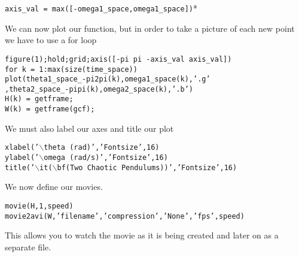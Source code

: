 \documentclass{article}
\begin{document}
\begin{center}
\texttt{axis\_val = max([-omega1\_space,omega1\_space])}* \\
\end{center}
We can now plot our function, but in order to take a picture of each new point we have to use a for loop
\begin{center}
\texttt{figure(1);hold;grid;axis([-pi pi -axis\_val axis\_val])} \\
\texttt{for k = 1:max(size(time\_space))} \\
\texttt{plot(theta1\_space\_-pi2pi(k),omega1\_space(k),'.g' \\ ,theta2\_space\_-pipi(k),omega2\_space(k),'.b')} \\
\texttt{H(k) = getframe; \\ W(k) = getframe(gcf);}
\end{center}
We must also label our axes and title our plot
\begin{center}
\texttt{xlabel('$\backslash$theta (rad)','Fontsize',16)} \\
\texttt{ylabel('$\backslash$omega (rad/s)','Fontsize',16)} \\
\texttt{title('$\backslash$it($\backslash$bf(Two Chaotic Pendulums))','Fontsize',16)} \\
\end{center}
We now define our movies.
\begin{center}
\texttt{movie(H,1,speed)} \\
\texttt{movie2avi(W,'filename','compression','None','fps',speed)} \\
\end{center}
This allows you to watch the movie as it is being created and later on as a separate file.
\end{document}
